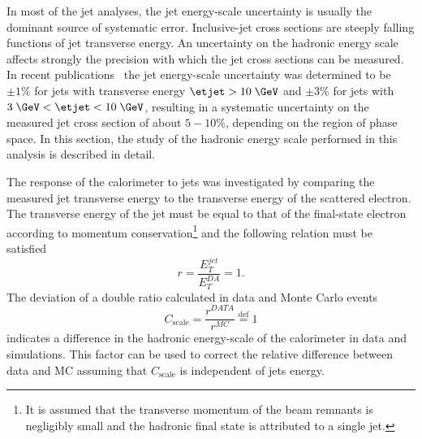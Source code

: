 In most of the jet analyses, the jet energy-scale uncertainty is usually the dominant source of systematic error. Inclusive-jet cross sections are steeply falling functions of jet transverse energy. An uncertainty on the hadronic energy scale affects strongly the precision with which the jet cross sections can be measured. In recent \zeus publications~\cite{epj:c70:965, np:b864:1} the jet energy-scale uncertainty was determined to be $\pm 1\%$ for jets with transverse energy $\etjet>10\; \GeV$ and $\pm 3\%$ for jets with $3\; \GeV<\etjet < 10\; \GeV$, resulting in a systematic uncertainty on the measured jet cross section of about $5-10\%$, depending on the region of phase space. In this section, the study of the hadronic energy scale performed in this analysis is described in detail.

The response of the calorimeter to jets was investigated by comparing the measured jet transverse energy to the transverse energy of the scattered electron. The transverse energy of the jet must be equal to that of the final-state electron according to momentum conservation\footnote{It is assumed that the transverse momentum of the beam remnants is negligibly small and the hadronic final state is attributed to a single jet.} and the following relation must be satisfied
\begin{equation}
r = \frac{E_T^{jet}}{E_T^{DA}} = 1.
\label{eq:etjetetelbalance}
\end{equation}
The deviation of a double ratio calculated in data and Monte Carlo events
\begin{equation}
C_\text{scale} = \frac{r^{DATA}}{r^{MC}} \stackrel{\mathrm{def}}{=} 1
\label{eq:cscale}
\end{equation}
indicates a difference in the hadronic energy-scale of the calorimeter in data and simulations. This factor can be used to correct the relative difference between data and MC assuming that $C_\text{scale}$ is independent of jets energy. 

